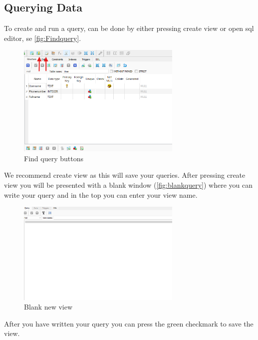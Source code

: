 \documentclass[a4paper,11pt,oneside]{article}
\begin{document}
\begin{sloppypar}
\subsection{Querying Data}
\label{sqliteStudioQueryingData}
To create and run a query, can be done by either pressing create view or open sql editor, se \autoref{fig:Findquery}.
\begin{figure}[!htb]
  \centering
  \includegraphics[width=0.7\textwidth]{sqlitestudio/queries/create_query_find.png}
  \caption{Find query buttons}
  \label{fig:Findquery}
\end{figure} 
We recommend create view as this will save your queries. After pressing create view you will be presented with a blank window (\autoref{fig:blankquery}) where you can write your query and in the top you can enter your view name.
\begin{figure}[!htb]
  \centering
  \includegraphics[width=0.7\textwidth]{sqlitestudio/queries/create_query_blank.png}
  \caption{Blank new view}
  \label{fig:blankquery}
\end{figure} 
After you have written your query you can press the green checkmark to save the view. 


\end{sloppypar}
\end{document}
